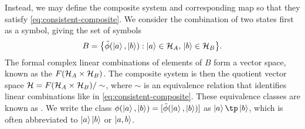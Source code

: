 \documentclass[../thesis.tex]{subfiles}
\begin{document}
Instead, we may define the composite system and corresponding map so that they
satisfy \cref{eq:consistent-composite}. We consider the combination of two
states first as a symbol, giving the set of symbols
\begin{equation}
  B
  = \qty{\tilde{\phi}\qty(\ket{a}, \ket{b}) : \ket{a} \in \mathcal{H}_A,\, \ket{b} \in
  \mathcal{H}_B}.
\end{equation}
The formal complex linear combinations of elements of $B$ form a vector space,
known as the  $F(\mathcal{H}_A \times \mathcal{H}_B)$. The composite
system is then the quotient vector space $\mathcal{H} = F(\mathcal{H}_A \times \mathcal{H}_B)
/\sim$, where $\sim$ is an equivalence relation that identifies linear
combinations like in \cref{eq:consistent-composite}. These equivalence classes
are known as . We write the class $\phi\qty(\ket{a}, \ket{b}) =
[\tilde{\phi}(\ket{a}, \ket{b})]$ as $\ket{a} \tp \ket{b}$, which is often
abbreviated to $\ket{a}\ket{b}$ or $\ket{a,b}$.
\end{document}
